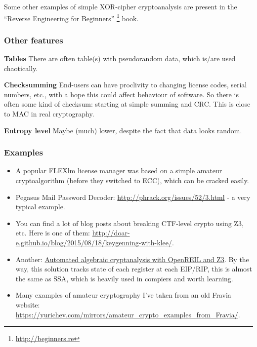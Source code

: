 Some other examples of simple XOR-cipher cryptoanalysis are present in the ``Reverse Engineering for Beginners''
\footnote{\url{http://beginners.re}} book.

\subsubsection{Other features}

\textbf{Tables} There are often table(s) with pseudorandom data, which is/are used chaotically.

\textbf{Checksumming} End-users can have proclivity to changing license codes, serial numbers, etc., with a hope
this could affect behaviour of software.
So there is often some kind of checksum: starting at simple summing and \ac{CRC}.
This is close to \ac{MAC} in real cryptography.

\textbf{Entropy level} Maybe (much) lower, despite the fact that data looks random.

\subsubsection{Examples}

\begin{itemize}

\item A popular FLEXlm license manager was based on a simple amateur cryptoalgorithm
(before they switched to \ac{ECC}), which can be cracked easily.

\item Pegasus Mail Password Decoder: \url{http://phrack.org/issues/52/3.html} -
a very typical example.

\item You can find a lot of blog posts about breaking \ac{CTF}-level crypto using Z3, etc.
Here is one of them: \url{http://doar-e.github.io/blog/2015/08/18/keygenning-with-klee/}.

\item Another: \href{http://blog.cr4.sh/2015/03/automated-algebraic-cryptanalysis-with.html}{Automated algebraic cryptanalysis with OpenREIL and Z3}.
By the way, this solution tracks state of each register at each EIP/RIP,
this is almost the same as \ac{SSA}, which is heavily used in compiers and worth learning.

\item Many examples of amateur cryptography I've taken from an old Fravia website:
\url{https://yurichev.com/mirrors/amateur_crypto_examples_from_Fravia/}.

\end{itemize}



